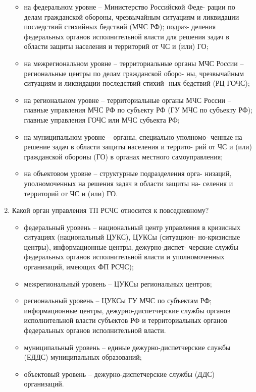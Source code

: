 \documentclass[oneside,final,14pt]{extreport}
\begin{document}
\begin{enumerate}
	\begin{itemize}
	\item на федеральном уровне – Министерство Российской Феде-
	рации по делам гражданской обороны, чрезвычайным ситуациям и
	ликвидации последствий стихийных бедствий (МЧС РФ); подраз-
	деления федеральных органов исполнительной власти для решения
	задач в области защиты населения и территорий от ЧС и (или) ГО;
	\item на межрегиональном уровне – территориальные органы
	МЧС России – региональные центры по делам гражданской оборо-
	ны, чрезвычайным ситуациям и ликвидации последствий стихий-
	ных бедствий (РЦ ГОЧС);
	\item на региональном уровне – территориальные органы МЧС
	России – главные управления МЧС РФ по субъекту РФ (ГУ МЧС по
	субъекту РФ); главные управления ГОЧС или МЧС субъекта РФ;
	\item на муниципальном уровне – органы, специально уполномо-
	ченные на решение задач в области защиты населения и террито-
	рий от ЧС и (или) гражданской обороны (ГО) в органах местного
	самоуправления;
	\item на объектовом уровне – структурные подразделения орга-
	низаций, уполномоченных на решения задач в области защиты на-
	селения и территорий от ЧС и (или) ГО.
	
	\end{itemize}
	
	\item  Какой орган управления ТП РСЧС относится к повседневному?
	\begin{itemize} 
	\item федеральный уровень – национальный центр управления в
	кризисных ситуациях (национальный ЦУКС), ЦУКСы (ситуацион-
	но-кризисные центры), информационные центры, дежурно-диспет-
	черские службы федеральных органов исполнительной власти и
	уполномоченных организаций, имеющих ФП РСЧС);
	\item межрегиональный уровень – ЦУКСы региональных центров;
	\item региональный уровень – ЦУКСы ГУ МЧС по субъектам РФ;
	информационные центры, дежурно-диспетчерские службы органов
	исполнительной власти субъектов РФ и территориальных органов
	федеральных органов исполнительной власти.
	\item муниципальный уровень – единые дежурно-диспетчерские
	службы (ЕДДС) муниципальных образований;
	\item объектовый уровень – дежурно-диспетчерские службы
	(ДДС) организаций.
	

\end{itemize}
\end{enumerate}
\end{document}
